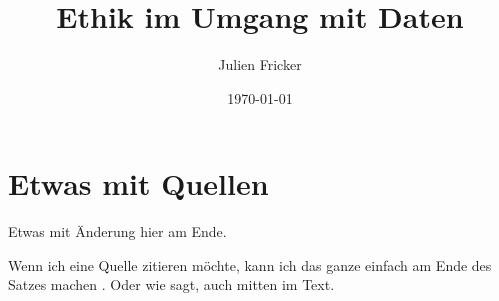\documentclass{report}
\title{Ethik im Umgang mit Daten}
\author{Julien Fricker}
\date{\today}
\begin{document}
\maketitle

\tableofcontents




\section{Etwas mit Quellen}

Etwas mit Änderung hier am Ende.

Wenn ich eine Quelle zitieren möchte, kann ich das ganze einfach am Ende des Satzes machen \citep{example}. Oder wie \citet{example} sagt, auch mitten im Text.

\printbibliography
\end{document}
